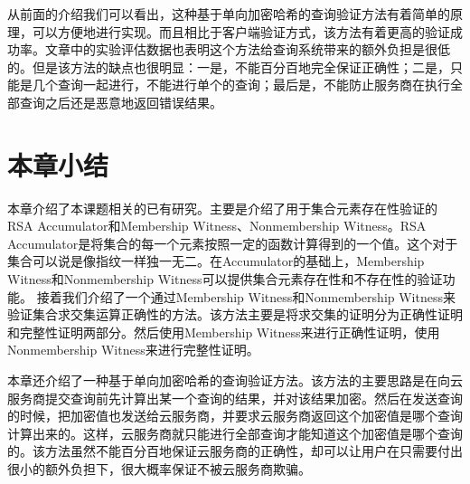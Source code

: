 从前面的介绍我们可以看出，这种基于单向加密哈希的查询验证方法有着简单的原理，可以方便地进行实现。而且相比于客户端验证方式，该方法有着更高的验证成功率。文章\cite{sion2005query}中的实验评估数据也表明这个方法给查询系统带来的额外负担是很低的。但是该方法的缺点也很明显：一是，不能百分百地完全保证正确性；二是，只能是几个查询一起进行，不能进行单个的查询；最后是，不能防止服务商在执行全部查询之后还是恶意地返回错误结果。

\section{本章小结}
本章介绍了本课题相关的已有研究。主要是介绍了用于集合元素存在性验证的RSA Accumulator和Membership Witness、Nonmembership Witness。RSA Accumulator是将集合的每一个元素按照一定的函数计算得到的一个值。这个对于集合可以说是像指纹一样独一无二。在Accumulator的基础上，Membership Witness和Nonmembership Witness可以提供集合元素存在性和不存在性的验证功能。
接着我们介绍了一个通过Membership Witness和Nonmembership Witness来验证集合求交集运算正确性的方法。该方法主要是将求交集的证明分为正确性证明和完整性证明两部分。然后使用Membership Witness来进行正确性证明，使用Nonmembership Witness来进行完整性证明。

本章还介绍了一种基于单向加密哈希的查询验证方法。该方法的主要思路是在向云服务商提交查询前先计算出某一个查询的结果，并对该结果加密。然后在发送查询的时候，把加密值也发送给云服务商，并要求云服务商返回这个加密值是哪个查询计算出来的。这样，云服务商就只能进行全部查询才能知道这个加密值是哪个查询的。该方法虽然不能百分百地保证云服务商的正确性，却可以让用户在只需要付出很小的额外负担下，很大概率保证不被云服务商欺骗。

